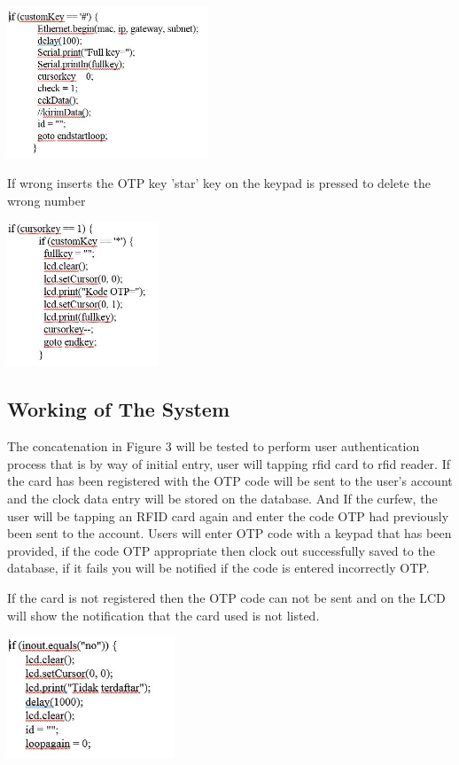 \begin{left}
\includegraphics[width=6cm]{figures/COde1.JPG}
\end{left}

If wrong inserts the OTP key 'star' key on the keypad is pressed to delete the wrong number

\begin{left}
\includegraphics[width=4.5cm]{figures/COde2.JPG}
\end{left}


\subsection{Working of The System}
The concatenation in Figure 3 will be tested to perform user authentication process that is by way of initial entry, user will tapping rfid card to rfid reader. If the card has been registered with the OTP code will be sent to the user's account and the clock data entry will be stored on the database. And If the curfew, the user will be tapping an RFID card again and enter the code OTP had previously been sent to the account. Users will enter OTP code with a keypad that has been provided, if the code OTP appropriate then clock out successfully saved to the database, if it fails you will be notified if the code is entered incorrectly OTP.

If the card is not registered then the OTP code can not be sent and on the LCD will show the notification that the card used is not listed.

\begin{left}
\includegraphics[width=5cm]{figures/COde3.JPG}
\end{left}

